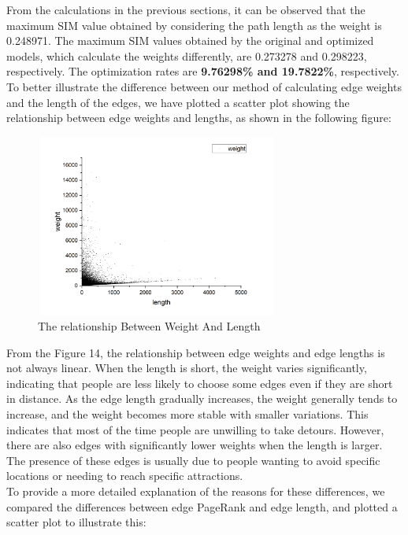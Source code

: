 \indent\indent From the calculations in the previous sections, it can be observed that the maximum SIM value obtained by considering the path length as the weight is 0.248971. The maximum SIM values obtained by the original and optimized models, which calculate the weights differently, are 0.273278 and 0.298223, respectively. The optimization rates are \textbf{9.76298\% and 19.7822\%}, respectively.\\
\indent To better illustrate the difference between our method of calculating edge weights and the length of the edges, we have plotted a scatter plot showing the relationship between edge weights and lengths, as shown in the following figure:
\begin{figure}[H]%
    \centering
    \includegraphics[width=8cm,height=6cm]{weight-length.png}
    \caption{The relationship Between Weight And Length}
\end{figure}
\indent From the Figure 14,  the relationship between edge weights and edge lengths is not always linear. When the length is short, the weight varies significantly, indicating that people are less likely to choose some edges even if they are short in distance. As the edge length gradually increases, the weight generally tends to increase, and the weight becomes more stable with smaller variations. This indicates that most of the time people are unwilling to take detours. However, there are also edges with significantly lower weights when the length is larger. The presence of these edges is usually due to people wanting to avoid specific locations or needing to reach specific attractions.\\
\indent To provide a more detailed explanation of the reasons for these differences, we compared the differences between edge PageRank and edge length, and plotted a scatter plot to illustrate this:

